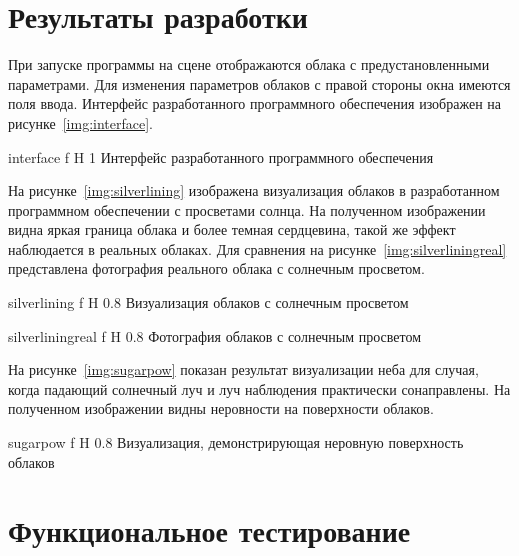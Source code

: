 \section{Результаты разработки}

При запуске программы на сцене отображаются облака с предустановленными параметрами. Для изменения параметров облаков с правой стороны окна имеются поля ввода. Интерфейс разработанного программного обеспечения изображен на рисунке~\ref{img:interface}.


{interface} %
{f} %
{H} %
{1\textwidth} %
{Интерфейс разработанного программного обеспечения} %


На рисунке~\ref{img:silverlining} изображена визуализация облаков в разработанном программном обеспечении с просветами солнца. На полученном изображении видна яркая граница облака и более темная сердцевина, такой же эффект наблюдается в реальных облаках. Для сравнения на рисунке~\ref{img:silverliningreal} представлена фотография реального облака с солнечным просветом.

{silverlining} %
{f} %
{H} %
{0.8\textwidth} %
{Визуализация облаков с солнечным просветом} %


{silverliningreal} %
{f} %
{H} %
{0.8\textwidth} %
{Фотография облаков с солнечным просветом} %

На рисунке~\ref{img:sugarpow} показан результат визуализации неба для случая, когда падающий солнечный луч и луч наблюдения практически сонаправлены. На полученном изображении видны неровности на поверхности облаков. 

{sugarpow} %
{f} %
{H} %
{0.8\textwidth} %
{Визуализация, демонстрирующая неровную поверхность облаков} %

\clearpage

\section{Функциональное тестирование}

